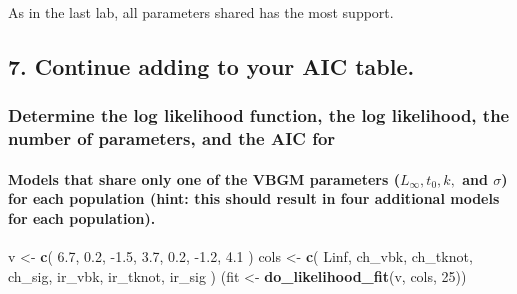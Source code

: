 \documentclass[
]{article}
\newenvironment{Shaded}{\begin{snugshade}}{\end{snugshade}}
\newcommand{\DecValTok}[1]{\textcolor[rgb]{0.00,0.00,0.81}{#1}}
\newcommand{\FloatTok}[1]{\textcolor[rgb]{0.00,0.00,0.81}{#1}}
\newcommand{\KeywordTok}[1]{\textcolor[rgb]{0.13,0.29,0.53}{\textbf{#1}}}
\newcommand{\NormalTok}[1]{#1}
\newcommand{\StringTok}[1]{\textcolor[rgb]{0.31,0.60,0.02}{#1}}
\begin{document}
As in the last lab, all parameters shared has the most support.

\hypertarget{continue-adding-to-your-aic-table.}{%
\subsection{7. Continue adding to your AIC
table.}\label{continue-adding-to-your-aic-table.}}

\hypertarget{determine-the-log-likelihood-function-the-log-likelihood-the-number-of-parameters-and-the-aic-for}{%
\subsubsection{Determine the log likelihood function, the log
likelihood, the number of parameters, and the AIC
for}\label{determine-the-log-likelihood-function-the-log-likelihood-the-number-of-parameters-and-the-aic-for}}

\hypertarget{models-that-share-only-one-of-the-vbgm-parameters-l_infty-t_0-k-and-sigma-for-each-population-hint-this-should-result-in-four-additional-models-for-each-population.}{%
\paragraph{\texorpdfstring{Models that share only one of the VBGM
parameters (\(L_{\infty}, t_0, k,\) and \(\sigma\)) for each population
(hint: this should result in four additional models for each
population).}{Models that share only one of the VBGM parameters (L\_\{\textbackslash infty\}, t\_0, k, and \textbackslash sigma) for each population (hint: this should result in four additional models for each population).}}\label{models-that-share-only-one-of-the-vbgm-parameters-l_infty-t_0-k-and-sigma-for-each-population-hint-this-should-result-in-four-additional-models-for-each-population.}}

\begin{Shaded}
\begin{Highlighting}[]
\NormalTok{v \textless{}{-}}\StringTok{ }\KeywordTok{c}\NormalTok{(}
  \FloatTok{6.7}\NormalTok{, }\FloatTok{0.2}\NormalTok{, }\FloatTok{{-}1.5}\NormalTok{,  }\FloatTok{3.7}\NormalTok{,}
  \FloatTok{0.2}\NormalTok{, }\FloatTok{{-}1.2}\NormalTok{,  }\FloatTok{4.1}
\NormalTok{) }
\NormalTok{cols \textless{}{-}}\StringTok{ }\KeywordTok{c}\NormalTok{(}
  \StringTok{\textquotesingle{}Linf\textquotesingle{}}\NormalTok{, }\StringTok{\textquotesingle{}ch\_vbk\textquotesingle{}}\NormalTok{, }\StringTok{\textquotesingle{}ch\_tknot\textquotesingle{}}\NormalTok{, }\StringTok{\textquotesingle{}ch\_sig\textquotesingle{}}\NormalTok{,}
  \StringTok{\textquotesingle{}ir\_vbk\textquotesingle{}}\NormalTok{, }\StringTok{\textquotesingle{}ir\_tknot\textquotesingle{}}\NormalTok{, }\StringTok{\textquotesingle{}ir\_sig\textquotesingle{}}
\NormalTok{)}
\NormalTok{(fit \textless{}{-}}\StringTok{ }\KeywordTok{do\_likelihood\_fit}\NormalTok{(v, cols, }\DecValTok{25}\NormalTok{))}
\end{Highlighting}
\end{Shaded}
\end{document}
